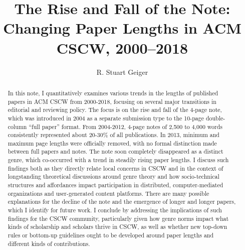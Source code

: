 \documentclass[format=acmsmall, screen=true]{acmart}
\begin{document}
%
\title{The Rise and Fall of the Note: Changing Paper Lengths in ACM CSCW, 2000--2018}


\author{R. Stuart Geiger}



%
\renewcommand{\shortauthors}{Geiger}

%
\begin{abstract}
In this note, I quantitatively examines various trends in the lengths of published papers in ACM CSCW from 2000-2018, focusing on several major transitions in editorial and reviewing policy. The focus is on the rise and fall of the 4-page note, which was introduced in 2004 as a separate submission type to the 10-page double-column ``full paper'' format. From 2004-2012, 4-page notes of 2,500 to 4,000 words consistently represented about 20-30\% of all publications. In 2013, minimum and maximum page lengths were officially removed, with no formal distinction made between full papers and notes. The note soon completely disappeared as a distinct genre, which co-occurred with a trend in steadily rising paper lengths. I discuss such findings both as they directly relate local concerns in CSCW and in the context of longstanding theoretical discussions around genre theory and how socio-technical structures and affordances impact participation in distributed, computer-mediated organizations and user-generated content platforms. There are many possible explanations for the decline of the note and the emergence of longer and longer papers, which I identify for future work. I conclude by addressing the implications of such findings for the CSCW community, particularly given how genre norms impact what kinds of scholarship and scholars thrive in CSCW, as well as whether new top-down rules or bottom-up guidelines ought to be developed around paper lengths and different kinds of contributions.
\end{abstract}
\end{document}
